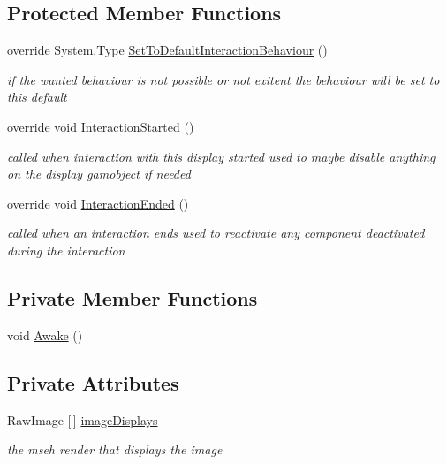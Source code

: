 \subsection*{Protected Member Functions}
\begin{DoxyCompactItemize}
\item 
override System.\+Type \mbox{\hyperlink{class_image_display_ae975595939d76dd1db32e6f029f53ab6}{Set\+To\+Default\+Interaction\+Behaviour}} ()
\begin{DoxyCompactList}\small\item\em if the wanted behaviour is not possible or not exitent the behaviour will be set to this default \end{DoxyCompactList}\item 
override void \mbox{\hyperlink{class_image_display_a1fdf91b09cd5329059d38033f1330ffb}{Interaction\+Started}} ()
\begin{DoxyCompactList}\small\item\em called when interaction with this display started used to maybe disable anything on the display gamobject if needed \end{DoxyCompactList}\item 
override void \mbox{\hyperlink{class_image_display_a94c5928ef81449c37740d0bd0a8f4062}{Interaction\+Ended}} ()
\begin{DoxyCompactList}\small\item\em called when an interaction ends used to reactivate any component deactivated during the interaction \end{DoxyCompactList}\end{DoxyCompactItemize}
\subsection*{Private Member Functions}
\begin{DoxyCompactItemize}
\item 
void \mbox{\hyperlink{class_image_display_a3dfa32d33641e56a6623265150b8ddba}{Awake}} ()
\end{DoxyCompactItemize}
\subsection*{Private Attributes}
\begin{DoxyCompactItemize}
\item 
Raw\+Image \mbox{[}$\,$\mbox{]} \mbox{\hyperlink{class_image_display_a3f64480a2ecdc17ac43e0db335ca8a4c}{image\+Displays}}
\begin{DoxyCompactList}\small\item\em the mseh render that displays the image \end{DoxyCompactList}\end{DoxyCompactItemize}
